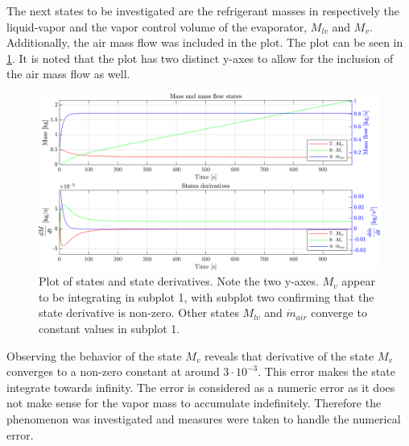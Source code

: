 The next states to be investigated are the refrigerant masses in respectively the liquid-vapor and the vapor control volume of the evaporator, $ M_{lv} $ and $ M_v $. Additionally, the air mass flow was included in the plot. The plot can be seen in \cref{fig:non_lin_sim_Mass_Mvfucked}. It is noted that the plot has two distinct y-axes to allow for the inclusion of the air mass flow as well.
\begin{figure}[h]
	\centering
	\includegraphics[width=1\textwidth]{Graphics/nonlin_sim_Mass_Mvfucked.png}
	\caption{Plot of states and state derivatives. Note the two y-axes. $ M_v $ appear to be integrating in subplot 1, with subplot two confirming that the state derivative is non-zero. Other states $ M_{lv} $ and $ \dot{m}_{air} $ converge to constant values in subplot 1.}
	\label{fig:non_lin_sim_Mass_Mvfucked}
\end{figure}
Observing the behavior of the state $ M_v $ reveals that  derivative of the state $M_v$ converges to a non-zero constant at around $ 3\cdot 10^{-3} $. This error makes the state integrate towards infinity. The error is considered as a numeric error as it does not make sense for the vapor mass to accumulate indefinitely. Therefore the phenomenon was investigated and measures were taken to handle the numerical error.

